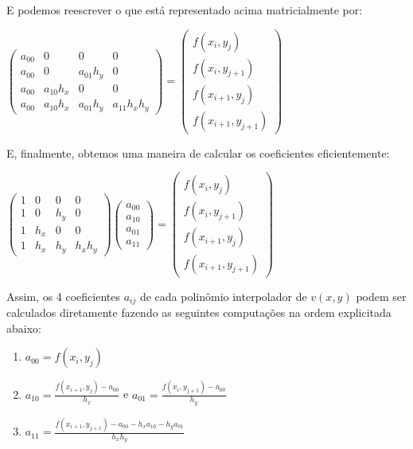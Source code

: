 \documentclass[11pt]{article}
\begin{document}
  E podemos reescrever o que está representado acima matricialmente por:

  \begin{center}
    $ \begin{pmatrix}
      a_{00} & 0         & 0         & 0 \\
      a_{00} & 0         & a_{01}h_y & 0 \\
      a_{00} & a_{10}h_x & 0         & 0 \\
      a_{00} & a_{10}h_x & a_{01}h_y & a_{11}h_xh_y
    \end{pmatrix}
    =
    \begin{pmatrix}
      f(x_i, y_j)  \\
      f(x_i, y_{j + 1})  \\
      f(x_{i + 1}, y_j)  \\
      f(x_{i + 1}, y_{j + 1})
    \end{pmatrix}$
  \end{center}

  E, finalmente, obtemos uma maneira de calcular os coeficientes eficientemente:

  \begin{center}
    $ \begin{pmatrix}
      1 & 0   & 0   & 0 \\
      1 & 0   & h_y & 0 \\
      1 & h_x & 0   & 0 \\
      1 & h_x & h_y & h_xh_y
    \end{pmatrix}
    \begin{pmatrix}
      a_{00}  \\
      a_{10}  \\
      a_{01}  \\
      a_{11}
    \end{pmatrix}
    =
    \begin{pmatrix}
      f(x_i, y_j)  \\
      f(x_i, y_{j + 1})  \\
      f(x_{i + 1}, y_j)  \\
      f(x_{i + 1}, y_{j + 1})
    \end{pmatrix}$
  \end{center}


  Assim, os 4 coeficientes $a_{ij}$ de cada polinômio interpolador de $v(x, y)$ podem ser calculados diretamente fazendo as seguintes computações na ordem explicitada abaixo:

  \begin{enumerate}[label=\textbf{\roman*.}]
    \item $a_{00} = f(x_i, y_j)$
    \item $a_{10} = \frac{f(x_{i + 1}, y_j) - a_{00}}{h_x}$ e $a_{01} = \frac{f(x_i, y_{j + 1}) - a_{00}}{h_y}$
    \item $a_{11} = \frac{f(x_{i + 1}, y_{j + 1}) - a_{00} - h_xa_{10} - h_ya_{01}}{h_xh_y}$
  \end{enumerate}
\end{document}
